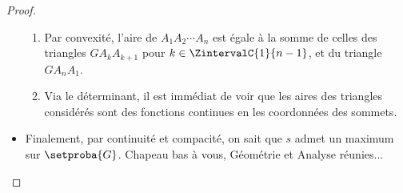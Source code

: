 \begin{proof}
\begin{itemize}
\begin{enumerate}
			\item Par convexité, l'aire de $A_1 A_2 \cdots A_n$ est égale à la somme de celles des triangles $G A_k A_{k+1}$ pour $k \in \ZintervalC{1}{n-1}$, et du triangle $G A_n  A_1$.

			\item Via le déterminant, il est immédiat de voir que les aires des triangles considérés sont des fonctions continues en les coordonnées des sommets.
		\end{enumerate}
		
		
		\item Finalement, par continuité et compacité, on sait que $s$ admet un maximum sur $\setproba{G}$. 
		Chapeau bas à vous, Géométrie et Analyse réunies...
	\end{itemize}	
\end{proof}
